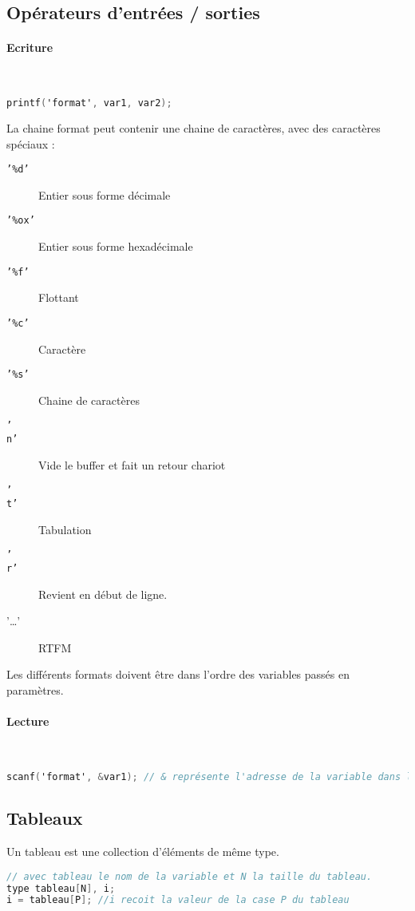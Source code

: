 \documentclass[12pt,a4paper,openany]{book}
\begin{document}
\subsection{Opérateurs d'entrées / sorties}
\paragraph{Ecriture}~\\
\begin{lstlisting}[language=C, caption=Syntaxe de l'appel de printf]
printf('format', var1, var2);
\end{lstlisting}
La chaine format peut contenir une chaine de caractères, avec des caractères spéciaux : 
\begin{description}
	\item[\texttt{'\%d'}] Entier sous forme décimale
	\item[\texttt{'\%ox'}] Entier sous forme hexadécimale
	\item[\texttt{'\%f'}] Flottant 
	\item[\texttt{'\%c'}] Caractère 
	\item[\texttt{'\%s'}] Chaine de caractères 
	\item[\texttt{'\\n'}] Vide le buffer et fait un retour chariot 
	\item[\texttt{'\\t'}] Tabulation 
	\item[\texttt{'\\r'}] Revient en début de ligne.
	\item['\ldots'] RTFM	
\end{description}
Les différents formats doivent être dans l'ordre des variables passés en paramètres.
\paragraph{Lecture}~\newline
\begin{lstlisting}[language=C, caption=Syntaxe de l'appel de scanf]
scanf('format', &var1); // & représente l'adresse de la variable dans laquelle écrire.
\end{lstlisting}

\subsection{Tableaux}
Un tableau est une collection d'éléments de même type.
\begin{lstlisting}[language=C, caption=Syntaxe de déclaration d'un tableau]
// avec tableau le nom de la variable et N la taille du tableau. 
type tableau[N], i; 
i = tableau[P]; //i recoit la valeur de la case P du tableau
\end{lstlisting}
\end{document}
